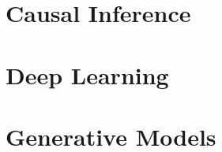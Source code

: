 \documentclass[12pt]{prettybook}
\begin{document}
\part{Causal Inference}


\part{Deep Learning}


\part{Generative Models}

\printbibliography
\appendix
\backmatter
\end{document}
